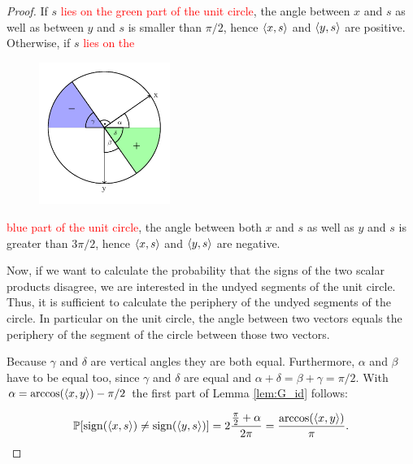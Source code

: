 \begin{proof}
	\noindent\begin{minipage}{\textwidth}
	If $s$ \textcolor{red}{lies on the green part of the unit circle}, the angle between $x$ and $s$ as well as between $y$ and $s$ is smaller than $\pi/2$, hence $\langle{x},{s}\rangle$ and $\langle{y},{s}\rangle$ are positive. Otherwise, if $s$ \textcolor{red}{lies on the}
		\begin{figure}
			\vspace{-20pt}
			\begin{center}
				\includegraphics[width=0.38\textwidth]{chapters/fig_unit_circle.pdf}
			\end{center}
			\vspace{-20pt}
		\end{figure}
		 \textcolor{red}{blue part of the unit circle}, the angle between both $x$ and $s$ as well as $y$ and $s$ is greater than $3\pi/2$, hence $\langle{x},{s}\rangle$ and $\langle{y},{s}\rangle$ are negative.
		
		\hspace{12pt} Now, if we want to calculate the probability that the signs of the two scalar products disagree, we are interested in the undyed segments of the unit circle. Thus, it is sufficient to calculate the periphery of the undyed segments of the circle. In particular on the unit circle, the angle between two vectors equals the periphery of the segment of the circle between those two vectors. 
			
		\hspace{12pt} Because $\gamma$ and $\delta$ are vertical angles they are both equal. Furthermore, $\alpha$ and $\beta$ have to be equal too, since $\gamma$ and $\delta$ are equal and $\alpha+\delta = \beta+\gamma = \pi/2$. With $\alpha = \arccos(\langle{x},{y}\rangle) - \pi/2$ the first part of Lemma \ref{lem:G_id} follows:
	\end{minipage}
	
	\begin{align*}
		\mathbb{P}[\operatorname{sign}(\langle{x},{s}\rangle)\neq\operatorname{sign}(\langle{y},{s}\rangle)]=2\frac{\frac{\pi}{2}+\alpha}{2\pi} = \frac{\arccos(\langle{x},{y}\rangle)}{\pi}.
	\end{align*}
	

\end{proof}
